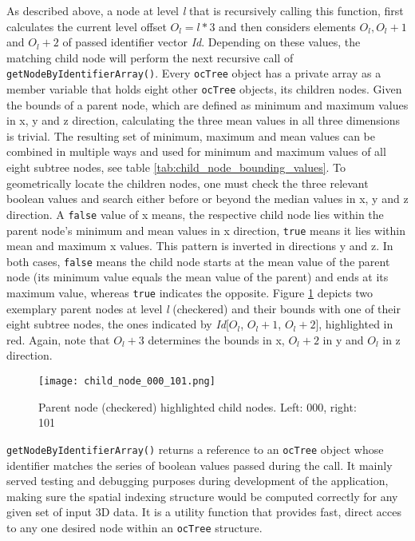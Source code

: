 \begin{description}
As described above, a node at level \textit{l} that is recursively calling this function, first calculates the current level offset $O_l = l*3$ and then considers elements $O_l, O_l+1$ and $O_l+2$ of passed identifier vector \textit{Id}. Depending on these values, the matching child node will perform the next recursive call of \texttt{getNodeByIdentifierArray()}. Every \texttt{ocTree} object has a private array as a member variable that holds eight other \texttt{ocTree} objects, its children nodes. Given the bounds of a parent node, which are defined as minimum and maximum values in x, y and z direction, calculating the three mean values in all three dimensions is trivial. The resulting  set of minimum, maximum and mean values can be combined in multiple ways and used for minimum and maximum values of all eight subtree nodes, see table \ref{tab:child_node_bounding_values}. To geometrically locate the children nodes, one must check the three relevant boolean values and search either before or beyond the median values in x, y and z direction. A \texttt{false} value of x means, the respective child node lies within the parent node's minimum and mean values in x direction, \texttt{true} means it lies within mean and maximum x values. This pattern is inverted in directions y and z. In both cases, \texttt{false} means the child node starts at the mean value of the parent node (its minimum value equals the mean value of the parent) and ends at its maximum value, whereas \texttt{true} indicates the opposite. Figure \ref{fig:child_node_000_101.png} depicts two exemplary parent nodes at level \textit{l} (checkered) and their bounds with one of their eight subtree nodes, the ones indicated by \textit{Id}[$O_l$, $O_l+1$, $O_l+2$], highlighted in red. Again, note that \texttt{$O_l+3$} determines the bounds in x, \texttt{$O_l+2$} in y and \texttt{$O_l$} in z direction.

\begin{figure}[htb]
  \centering
  \texttt{[image: child\_node\_000\_101.png]}\\ %
  \caption{Parent node (checkered) highlighted child nodes. Left: 000, right: 101}\label{fig:child_node_000_101.png}
\end{figure}

\texttt{getNodeByIdentifierArray()} returns a reference to an \texttt{ocTree} object whose identifier matches the series of boolean values passed during the call. It mainly served testing and debugging purposes during development of the application, making sure the spatial indexing structure would be computed correctly for any given set of input 3D data. It is a utility function that provides fast, direct acces to any one desired node within an \texttt{ocTree} structure.


\end{description}

